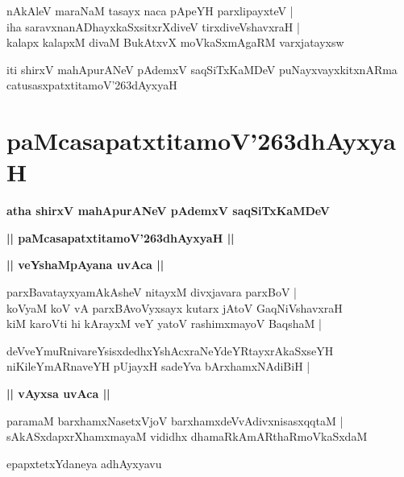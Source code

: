 \documentclass[twoside,12pt,openright]{book}
\def\S{\char'263}
\newcounter{shloka}[chapter]
\def\uvaca#1{\centerline{{\large\textbf{#1}}}}
\begin{document}
\begin{shloka}%
nAkAleV maraNaM tasayx naca pApeYH parxlipayxteV |\\
iha saravxnanADhayxkaSxsitxrXdiveV tirxdiveVshavxraH |\\
kalapx kalapxM divaM BukAtxvX moVkaSxmAgaRM varxjatayxsw
\end{shloka}

\begin{center}
iti shirxV mahApurANeV pAdemxV saqSiTxKaMDeV puNayxvayxkitxnARma catusasxpatxtitamoV\S dAyxyaH
\end{center}

\chapter{paMcasapatxtitamoV\S dhAyxyaH}

\begin{center}
{\LARGE\bfseries atha shirxV mahApurANeV pAdemxV saqSiTxKaMDeV}
\end{center}

\begin{center}
{\LARGE\bfseries || paMcasapatxtitamoV\S dhAyxyaH || }
\end{center}

\uvaca{|| veYshaMpAyana uvAca ||}

\begin{shloka}%
parxBavatayxyamAkAsheV nitayxM divxjavara parxBoV |\\
koVyaM koV vA parxBAvoVyxsayx kutarx jAtoV GaqNiVshavxraH \\
kiM karoVti hi kArayxM veY yatoV rashimxmayoV BaqshaM |
\end{shloka}

\begin{shloka}%
deVveYmuRnivareYsisxdedhxYshAcxraNeYdeYRtayxrAkaSxseYH \\
niKileYmARnaveYH pUjayxH sadeYva bArxhamxNAdiBiH |
\end{shloka}

\uvaca{|| vAyxsa uvAca ||}

\begin{shloka}%
paramaM barxhamxNasetxVjoV barxhamxdeVvAdivxnisasxqqtaM |\\
sAkASxdapxrXhamxmayaM vididhx dhamaRkAmARthaRmoVkaSxdaM 
\end{shloka}

\begin{center}
epapxtetxYdaneya adhAyxyavu
\end{center}
\end{document}
